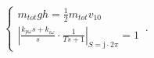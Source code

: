 \begin{equation}
    \begin{cases}
      m_{tot} g h = \frac{1}{2} m_{tot} v_ 10\\
      \left\lvert\frac{k_{p\omega}s+k_{i\omega}}{s}\cdot\frac{1}{Ts+1}\right\rvert_{S=\mathrm{j}\cdot2\pi}=1
    \end{cases}\,.
\end{equation}